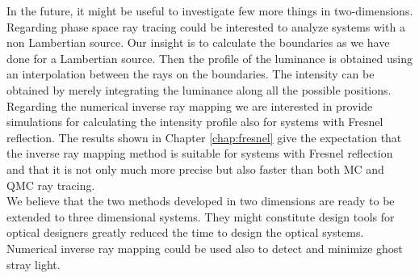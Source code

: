 In the future, it might be useful to investigate few more things in two-dimensions. \\ \indent 
Regarding phase space ray tracing could be interested to analyze systems with a non Lambertian source. Our insight is to calculate the boundaries as we have done for a Lambertian source. Then the profile of the luminance is obtained using an interpolation between the rays on the boundaries. The intensity can be obtained by merely integrating the luminance along all the possible positions. \\ \indent 
Regarding the numerical inverse ray mapping we are interested in provide simulations for calculating the intensity profile also for systems with Fresnel reflection. The results shown in Chapter \ref{chap:fresnel} give the expectation that the inverse ray mapping method is suitable for systems with Fresnel reflection and that it is not only much more precise but also faster than both MC and QMC ray tracing. \\ \indent 
We believe that the two methods developed in two dimensions are ready to be extended to three dimensional systems. They might constitute design tools for optical designers greatly reduced the time to design the optical systems. Numerical inverse ray mapping could be used also to detect and minimize ghost stray light.
